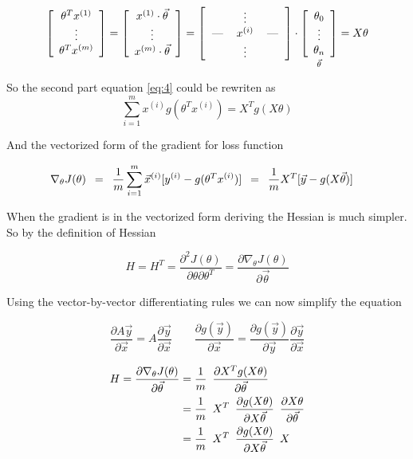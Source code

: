 \documentclass{article}
\begin{document}
\[
\left[
  \begin{array}{c}
	{\theta^T}x^{(1)} \\
	\vdots\\
	{\theta^T}x^{(m)}
  \end{array}
\right]
=
\left[
  \begin{array}{c}
	x^{(1)} \cdot {\vec{\theta}} \\
	\vdots\\
	x^{(m)} \cdot {\vec{\theta}} \\
  \end{array}
\right]
= 
\left[
  \begin{tabular}{c>{$}c<{$}c}
    & \vdots & \\
    --- & x^{(i)} & ---\\
    & \vdots & \\
  \end{tabular}
\right]
\cdot
\underset{\vec{\theta}}
{\left[
  \begin{array}{c}
	\theta_0 \\
	\vdots\\
	\theta_n
  \end{array}
\right]}
=X \theta
\]

So the second part equation \eqref{eq:4} could be rewriten as
\[
\sum_{i=1}^m   x^{(i)}  g({\theta^T}x^{(i)}) 
= 
X^Tg(X \theta)
\]

And the vectorized form of the gradient for loss function

\begin{align}
\nabla_{\theta} J(\theta) 
\enskip &= \enskip 
\frac1m \sum_{i=1}^m   \vec{x}^{(i)}[y^{(i)} -  g({\theta^T}x^{(i)})] 
\enskip = \enskip
\frac1m X^T[\vec{y} - g(X \vec \theta)]
\end{align}

When the gradient is in the vectorized form deriving the Hessian is much simpler. So by the definition of Hessian

\[
H = H^T = \frac{\partial^2J(\theta)}{\partial\theta\partial\theta^T}
=\frac{\partial\nabla_{\theta}J(\theta)}{\partial\vec{\theta}}
\]

Using the vector-by-vector differentiating rules we can now simplify the equation

\[
\frac{\partial A\vec y}{\partial \vec x} = A \frac{\partial \vec y}{\partial \vec x} \qquad
\frac{\partial g(\vec y)}{\partial \vec x} =  \frac{\partial g(\vec y)}{\partial \vec y}  \frac{\partial \vec y}{\partial \vec x}
\]

\begin{align}
	H = \frac{\partial\nabla_{\theta}J(\theta)}{\partial\vec{\theta}}
	&= \frac1m \enskip  \frac{\partial X^T g(X\theta)}{\partial\vec{\theta}} \\
	&= \frac1m \enskip  X^T \enskip \frac{\partial  g(X\theta)}{\partial X \vec{\theta}} \enskip  \frac{\partial X\theta}{\partial \vec{\theta}} \\
	& = \frac1m \enskip  X^T \enskip \frac{\partial  g(X\theta)}{\partial X \vec{\theta}} \enskip  X 
\end{align}
\end{document}
